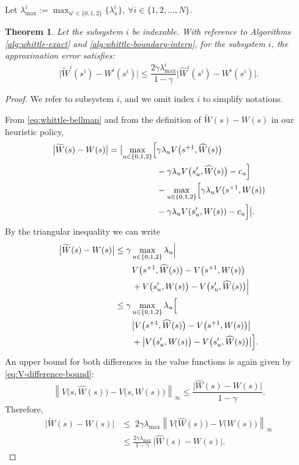 \documentclass[letterpaper,journal]{IEEEtran}
\newtheorem{theorem}{Theorem}
\begin{document}
Let $\lambda^i_{\max}:=\max_{u^i\in\{0,1,2\}}\{\lambda_u^i\}, \ \forall i\in\{1,2,\dots,N\}.$
	
\begin{theorem}\label{th:UB-for-whittle-error}
Let the subsystem $i$ be indexable. With reference to Algorithms \ref{alg:whittle-exact} and \ref{alg:whittle-boundary-interp}, for the subsystem $i$, the approximation error satisfies:
\[
\bigl|\widetilde{W}^i(s^i)-W^i(s^i)\bigr|
\leq\frac{2\gamma\lambda^i_{\max}}{1-\gamma}
\bigl|\widehat{W}^i(s^i)-W^i(s^i)\bigr|.
\]
\end{theorem}
	
\begin{proof}
We refer to subsystem $i$, and we omit index $i$ to simplify notations.

From \eqref{eq:whittle-bellman} and from the definition of $\widetilde{W}(s)-W(s)$ in our heuristic policy,
\[
\begin{aligned}
\bigl|\widetilde{W}(s)-W(s)\bigr|=\bigl|\max_{u\in\{0,1,2\}}\Bigl[
&\gamma\lambda_u V\bigl(s^{+1}, \widehat W(s)\bigr)\\
&-\gamma\lambda_u V\bigl(s'_u, \widehat W(s)\bigr)-c_u\Bigr]\\
&-\max_{u\in\{0,1,2\}}\Bigl[\gamma\lambda_uV(s^{+1},W(s))\\&-\gamma\lambda_uV(s'_u,W(s))-c_u\Bigr]\bigr|.
\end{aligned}
\]
By the triangular inequality we can write
\[
\begin{aligned}
\bigl|\widetilde{W}(s)-W(s)\bigr|
&\leq \gamma\max_{u\in\{0,1,2\}}\lambda_u
\Bigl|\\
&\qquad V\bigl(s^{+1},\widehat{W}(s)\bigr)-V\bigl(s^{+1},W(s)\bigr)\\
&\qquad + V\bigl(s'_u,W(s)\bigr)-V\bigl(s'_u,\widehat{W}(s)\bigr)\Bigr|\\
&\leq \gamma\max_{u\in\{0,1,2\}}\lambda_u
\Bigl[\\
&\qquad \bigl|V\bigl(s^{+1},\widehat{W}(s)\bigr)-V\bigl(s^{+1},W(s)\bigr)\bigr|\\
&\qquad + \bigl|V\bigl(s'_u,W(s)\bigr)-V\bigl(s'_u,\widehat{W}(s)\bigr)\bigr|\Bigr].
\end{aligned}
\]
An upper bound for both differences in the value functions is again given by \eqref{eq:V-difference-bound}:
\[
\left\|V\bigl(s,\widehat{W}(s)\bigr)-V\bigl(s,W(s)\bigr)\right\|_\infty
\leq\frac{\bigl|\widehat{W}(s)-W(s)\bigr|}{1-\gamma}.
\]
Therefore,
\[
\begin{aligned}
\bigl|\widetilde{W}(s)-W(s)\bigr|&\leq\;2\gamma\lambda_{\max}\left\|V\bigl(\widehat{W}(s)\bigr)-V\bigl(W(s)\bigr)\right\|_\infty\\
&\leq\frac{2\gamma\lambda_{\max}}{1-\gamma}\,\bigr|\widehat{W}(s)-W(s)\bigl|.
\end{aligned}
\]
\end{proof}
\end{document}
